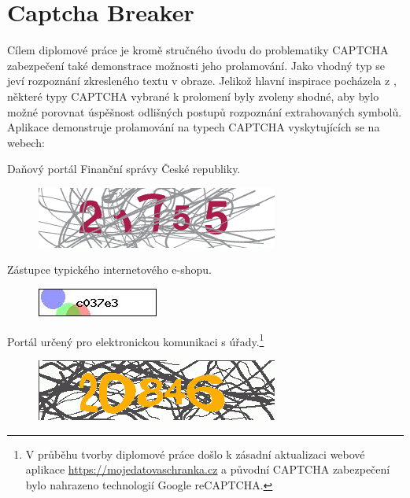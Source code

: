 \documentclass[
  field=ainfp,
  master=true,
  biblatex,
  sourcecodes=false,
  theorems=false,
  glossaries,
  index
]{kidiplom}
\begin{document}
\section{Captcha Breaker}
Cílem diplomové práce je kromě stručného úvodu do problematiky CAPTCHA zabezpečení také demonstrace možnosti jeho prolamování. Jako vhodný typ se jeví rozpoznání zkresleného textu v obraze. Jelikož hlavní inspirace pocházela z \cite{Kopp2016HowTM}, některé typy CAPTCHA vybrané k prolomení byly zvoleny shodné, aby bylo možné porovnat úspěšnost odlišných postupů rozpoznání extrahovaných symbolů. Aplikace demonstruje prolamování na typech CAPTCHA vyskytujících se na webech:
\begin{description}[align=left]
\item [\href{https://adiseet.mfcr.cz}{adiseet.mfcr.cz}] Daňový portál Finanční správy České republiky.
\begin{figure}[H]
  \centering
  \includegraphics[scale=0.5]{images/eet.png}
\end{figure}

\item [\href{https://kamody.cz}{kamody.cz}] Zástupce typického internetového e-shopu.
\begin{figure}[H]
  \centering
  \includegraphics{images/kamody.jpg}
\end{figure}

\item [\href{https://mojedatovaschranka.cz}{mojedatovaschranka.cz}] Portál určený pro elektronickou komunikaci s úřady.\footnote{V průběhu tvorby diplomové práce došlo k zásadní aktualizaci webové aplikace \url{https://mojedatovaschranka.cz} a původní CAPTCHA zabezpečení bylo nahrazeno technologií Google reCAPTCHA.}
\begin{figure}[H]
  \centering
  \includegraphics[scale=0.5]{images/datovka.png}
\end{figure}


\end{description}
\end{document}
